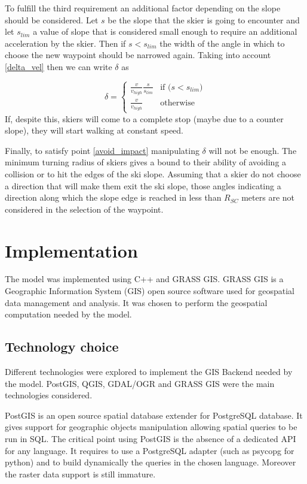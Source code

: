 \documentclass[12pt,a4paper,twoside]{book}
\begin{document}
To fulfill the third requirement an additional factor depending on the slope should be considered. Let $s$ be the slope that the skier is going to encounter and let $s_{lim}$ a value of slope that is considered small enough to require an additional acceleration by the skier. Then if $s<s_{lim}$ the width of the angle in which to choose the new waypoint should be narrowed again. Taking into account \ref{delta_vel} then we can write $\delta$ as

\begin{equation}
\delta=\begin{cases}
   \frac{v}{v_{high}}\frac{s}{s_{lim}} & \text{if ($s < s_{lim}$)} \\
   \frac{v}{v_{high}} & \text{otherwise}
\end{cases}
\end{equation}
If, despite this, skiers will come to a complete stop (maybe due to a counter slope), they will start walking at constant speed.

Finally, to satisfy point \ref{avoid_impact} manipulating $\delta$ will not be enough. The minimum turning radius of skiers gives a bound to their ability of avoiding a collision or to hit the edges of the ski slope. Assuming that a skier do not choose a direction that will make them exit the ski slope, those angles indicating a direction along which the slope edge is reached in less than $R_{SC}$ meters are not considered in the selection of the waypoint.

\chapter{Implementation}\label{implementation}
The model was implemented using C++ and GRASS GIS. GRASS GIS is a Geographic Information System (GIS) open source software used for geospatial data management and analysis. It was chosen to perform the geospatial computation needed by the model.

\section{Technology choice}
Different technologies were explored to implement the GIS Backend needed by the model. PostGIS, QGIS, GDAL/OGR and GRASS GIS were the main technologies considered.

PostGIS is an open source spatial database extender for PostgreSQL database. It gives support for geographic objects manipulation allowing spatial queries to be run in SQL. The critical point using PostGIS is the absence of a dedicated API for any language. It requires to use a PostgreSQL adapter (such as psycopg for python) and to build dynamically the queries in the chosen language. Moreover the raster data support is still immature.
\end{document}
